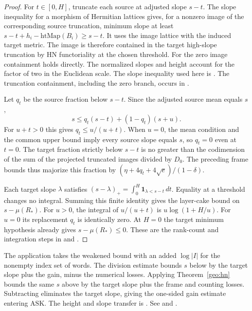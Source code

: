 \begin{proof}
For \(t\in[0,H]\), truncate each source at adjusted slope \(s-t\). The slope inequality for a morphism of Hermitian lattices gives, for a nonzero image of the corresponding source truncation, minimum slope at least \(s-t+h_i-\mathrm{htMap}(B_i)\ge s-t\). It uses the image lattice with the induced target metric. The image is therefore contained in the target high-slope truncation by HN functoriality at the chosen threshold. For the zero image containment holds directly. The normalized slopes and height account for the factor of two in the Euclidean scale. The slope inequality used here is . The truncation containment, including the zero branch, occurs in .

Let \(q_t\) be the source fraction below \(s-t\). Since the adjusted source mean equals \(s\),
\[
 s\le q_t(s-t)+(1-q_t)(s+u).
\]
For \(u+t>0\) this gives \(q_t\le u/(u+t)\). When \(u=0\), the mean condition and the common upper bound imply every source slope equals \(s\), so \(q_t=0\) even at \(t=0\). The target fraction strictly below \(s-t\) is no greater than the codimension of the sum of the projected truncated images divided by \(D_0\). The preceding frame bounds thus majorize this fraction by \((\eta+4q_t+4\sqrt e)/(1-\delta)\).

Each target slope \(\lambda\) satisfies \((s-\lambda)_+=\int_0^H\mathbf1_{\lambda<s-t}\,dt\). Equality at a threshold changes no integral. Summing this finite identity gives the layer-cake bound on \(s-\mu(R_*)\). For \(u>0\), the integral of \(u/(u+t)\) is \(u\log(1+H/u)\). For \(u=0\) its replacement \(q_t\) is identically zero. At \(H=0\) the target minimum hypothesis already gives \(s-\mu(R_*)\le0\). These are the rank-count and integration steps in  and .
\end{proof}

The application takes the weakened bound with an added \(\log|I|\) for the nonempty index set of words. The division estimate bounds \(s\) below by the target slope plus the gain, minus the numerical losses. Applying Theorem~\ref{geo:hn} bounds the same \(s\) above by the target slope plus the frame and counting losses. Subtracting eliminates the target slope, giving the one-sided gain estimate entering \(\mathrm{ASK}\). The height and slope transfer is . See  and .

